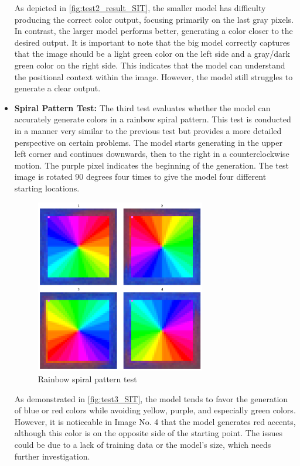 \begin{itemize}
        As depicted in \autoref{fig:test2_result_SIT}, the smaller model has difficulty producing the correct color output, focusing primarily on the last gray pixels. In contrast, the larger model performs better, generating a color closer to the desired output. It is important to note that the big model correctly captures that the image should be a light green color on the left side and a gray/dark green color on the right side. This indicates that the model can understand the positional context within the image. However, the model still struggles to generate a clear output.
        

        \item \textbf{Spiral Pattern Test:} The third test evaluates whether the model can accurately generate colors in a rainbow spiral pattern. This test is conducted in a manner very similar to the previous test but provides a more detailed perspective on certain problems. The model starts generating in the upper left corner and continues downwards, then to the right in a counterclockwise motion. The purple pixel indicates the beginning of the generation. The test image is rotated 90 degrees four times to give the model four different starting locations.

        \begin{figure}[H]
            \centering
            \includegraphics[width=0.7\textwidth]{imgs/RainbowImageTest_5.0.1.0_big.png}
            \caption{Rainbow spiral pattern test}
            \label{fig:test3_SIT}
        \end{figure}
        
        As demonstrated in \autoref{fig:test3_SIT}, the model tends to favor the generation of blue or red colors while avoiding yellow, purple, and especially green colors. However, it is noticeable in Image No. 4 that the model generates red accents, although this color is on the opposite side of the starting point. The issues could be due to a lack of training data or the model's size, which needs further investigation.
        

    \end{itemize}

